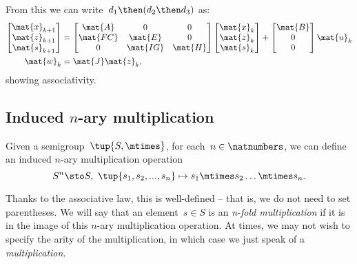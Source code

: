 From this we can write~$d_1\then (d_2\then d_3)$ as:
\begin{equation*}
  \label{eq:dlin-7}
  \begin{aligned}
    \begin{bmatrix}
      \mat{x}_{k+1}\\
      \mat{z}_{k+1}\\
      \mat{s}_{k+1}
    \end{bmatrix}&=
    \begin{bmatrix}
      \mat{A}&0&0\\
      \mat{FC}&\mat{E}&0\\
      0&\mat{IG}&\mat{H}
    \end{bmatrix}\begin{bmatrix}
                   \mat{x}_k\\ \mat{z}_k\\ \mat{s}_k
    \end{bmatrix}+
    \begin{bmatrix}
      \mat{B}\\ 0\\ 0
    \end{bmatrix}\mat{u}_k\\
    \mat{w}_k&=\mat{J}\mat{z}_k,
  \end{aligned}
\end{equation*}
showing associativity.

\subsection{Induced $n$-ary multiplication}
Given a semigroup~$\tup{S, \mtimes}$, for each~$n \in \natnumbers$, we can define an induced $n$-ary multiplication operation
\begin{equation*}
  S^n \sto S, \ \tup{s_1, s_2, ..., s_n} \mapsto s_1 \mtimes s_2 \dots \mtimes s_n.
\end{equation*}





Thanks to the associative law, this is well-defined -- that is, we do not need to set parentheses.
We will say that an element~$s \in S$ is an \emph{n-fold multiplication} if it is in the image of this $n$-ary multiplication operation.
At times, we may not wish to specify the arity of the multiplication, in which case we just speak of a \emph{multiplication}.

